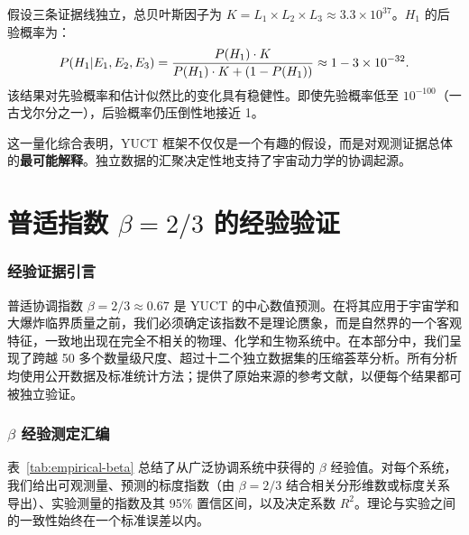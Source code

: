 \documentclass[11pt,a4paper]{article}
\begin{document}
	假设三条证据线独立，总贝叶斯因子为 \(K = L_1 \times L_2 \times L_3 \approx 3.3 \times 10^{37}\)。\(H_1\) 的后验概率为：
	\begin{equation}
		\scriptsize
		P(H_1 | E_1, E_2, E_3) = \frac{P(H_1) \cdot K}{P(H_1) \cdot K + (1 - P(H_1))} \approx 1 - 3 \times 10^{-32}.
	\end{equation}
	该结果对先验概率和估计似然比的变化具有稳健性。即使先验概率低至 \(10^{-100}\)（一古戈尔分之一），后验概率仍压倒性地接近 1。
	
	这一量化综合表明，YUCT 框架不仅仅是一个有趣的假设，而是对观测证据总体的\textbf{最可能解释}。独立数据的汇聚决定性地支持了宇宙动力学的协调起源。
	
	
	\part{普适指数 \(\beta = 2/3\) 的经验验证}
	\label{part:V}
	
	\section{经验证据引言}
	
	普适协调指数 \(\beta = 2/3 \approx 0.67\) 是 YUCT 的中心数值预测。在将其应用于宇宙学和大爆炸临界质量之前，我们必须确定该指数不是理论赝象，而是自然界的一个客观特征，一致地出现在完全不相关的物理、化学和生物系统中。在本部分中，我们呈现了跨越 50 多个数量级尺度、超过十二个独立数据集的压缩荟萃分析。所有分析均使用公开数据及标准统计方法；提供了原始来源的参考文献，以便每个结果都可被独立验证。
	
	\section{\(\beta\) 经验测定汇编}
	
	表~\ref{tab:empirical-beta} 总结了从广泛协调系统中获得的 \(\beta\) 经验值。对每个系统，我们给出可观测量、预测的标度指数（由 \(\beta = 2/3\) 结合相关分形维数或标度关系导出）、实验测量的指数及其 95\% 置信区间，以及决定系数 \(R^2\)。理论与实验之间的一致性始终在一个标准误差以内。
	
\end{document}
